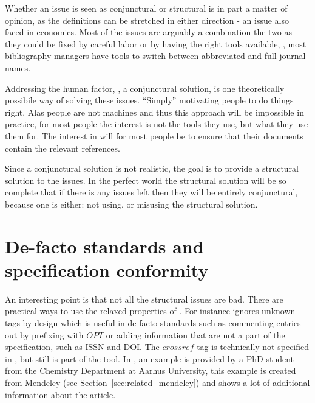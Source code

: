 Whether an issue is seen as conjunctural or structural is in part a
matter of opinion, as the definitions can be stretched in either
direction - an issue also faced in economics.  Most of the issues are
arguably a combination the two as they could be fixed by careful labor
or by having the right tools available, \eg, most bibliography
managers have tools to switch between abbreviated and full journal
names. 

Addressing the human factor, \ie, a conjunctural solution, is one
theoretically possibile way of solving these issues.  ``Simply''
motivating people to do things right.  Alas people are not machines
and thus this approach will be impossible in practice, for most people
the interest is not the tools they use, but what they use them for.
The interest in {\bibtex} will for most people be to ensure that their
documents contain the relevant references.

Since a conjunctural solution is not realistic, the goal is to provide
a structural solution to the issues.  In the perfect world the
structural solution will be so complete that if there is any issues
left then they will be entirely conjunctural, because one is either:
not using, or misusing the structural solution.


\section{De-facto standards and specification conformity}
\label{sec:problems_de_facto}

An interesting point is that not all the structural issues are bad.
There are practical ways to use the relaxed properties of {\bibtex}.
For instance {\bibtex} ignores unknown tags by design which is useful
in de-facto standards such as commenting entries out by prefixing with
$OPT$ or adding information that are not a part of the {\bibtex}
specification, such as ISSN and DOI.  The $crossref$ tag is
technically not specified in {\bibtex}, but still is part of the tool.
In , an example is provided by a PhD
student from the Chemistry Department at Aarhus University, this
example is created from Mendeley (see
Section~\ref{sec:related_mendeley}) and shows a lot of additional
information about the article.

